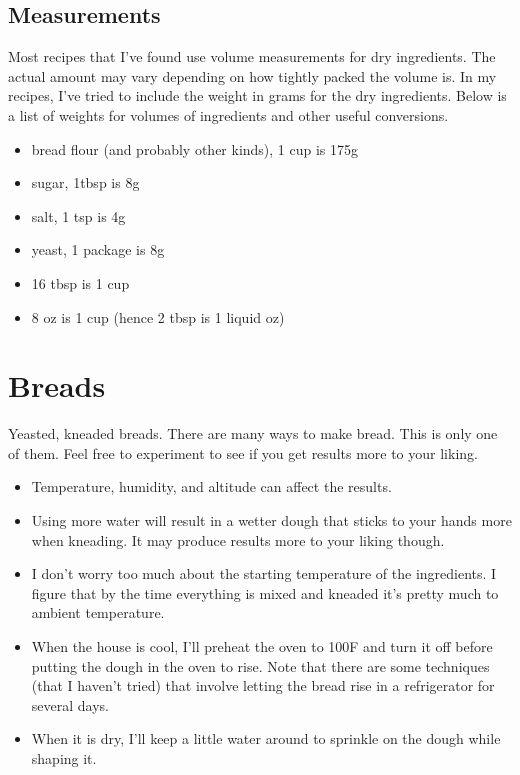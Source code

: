 \documentclass[10pt, openany]{book}
\begin{document}
\section{Measurements}
Most recipes that I've found use volume measurements for dry ingredients.  The actual amount may vary depending on how tightly packed the volume is.  In my recipes, I've tried to include the weight in grams for the dry ingredients.  Below is a list of weights for volumes of ingredients and other useful conversions.
\begin{itemize}
  \item bread flour (and probably other kinds), 1 cup is 175g
  \item sugar, 1tbsp is 8g
  \item salt, 1 tsp is 4g
  \item yeast, 1 package is 8g
  \item 16 tbsp is 1 cup
  \item 8 oz is 1 cup (hence 2 tbsp is 1 liquid oz)
\end{itemize}

\chapter{Breads}
Yeasted, kneaded breads.  There are many ways to make bread.  This is only one of them.  Feel free to experiment to see if you get results more to your liking.
\begin{itemize}
  \item Temperature, humidity, and altitude can affect the results.
  \item Using more water will result in a wetter dough that sticks to your hands more when kneading.  It may produce results more to your liking though.
  \item I don't worry too much about the starting temperature of the ingredients.  I figure that by the time everything is mixed and kneaded it's pretty much to ambient temperature.
  \item When the house is cool, I'll preheat the oven to 100\degree{}F and turn it off before putting the dough in the oven to rise.  Note that there are some techniques (that I haven't tried) that involve letting the bread rise in a refrigerator for several days.
  \item When it is dry, I'll keep a little water around to sprinkle on the dough while shaping it.
\end{itemize}
\end{document}
